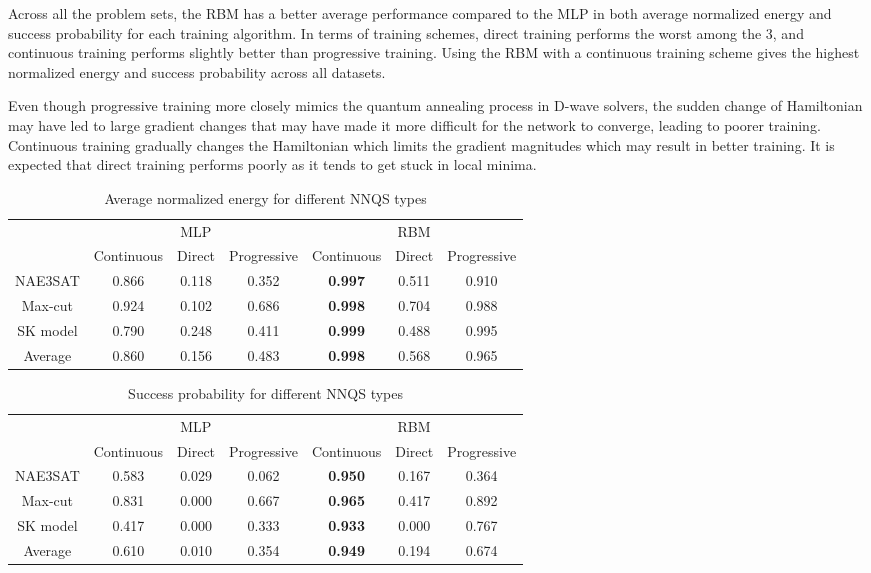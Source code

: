 Across all the problem sets, the RBM has a better average performance compared to the MLP in both average normalized energy and success probability for each training algorithm. In terms of training schemes, direct training performs the worst among the 3, and continuous training performs slightly better than progressive training. Using the RBM with a continuous training scheme gives the highest normalized energy and success probability across all datasets. 

Even though progressive training more closely mimics the quantum annealing process in D-wave solvers, the sudden change of Hamiltonian may have led to large gradient changes that may have made it more difficult for the network to converge, leading to poorer training. Continuous training gradually changes the Hamiltonian which limits the gradient magnitudes which may result in better training. It is expected that direct training performs poorly as it tends to get stuck in local minima.


\begin{table}[!ht]
    \centering
    \begin{tabular}{ccccccc} \toprule
        ~ & \multicolumn{3}{c}{MLP} & \multicolumn{3}{c}{RBM} \\
        \cmidrule{2-7} & Continuous & Direct & Progressive & Continuous & Direct & Progressive \\
        \midrule
        NAE3SAT & 0.866 & 0.118 & 0.352 & \textbf{0.997} & 0.511 & 0.910 \\
        Max-cut & 0.924 & 0.102 & 0.686 & \textbf{0.998} & 0.704 & 0.988 \\
        SK model & 0.790 & 0.248 & 0.411 & \textbf{0.999} & 0.488 & 0.995 \\ \midrule
        Average & 0.860 & 0.156 & 0.483 & \textbf{0.998} & 0.568 & 0.965 \\ \bottomrule
    \end{tabular}
    \caption{Average normalized energy for different NNQS types}
    \label{results:nnqsnormalizedenergy}
\end{table}

\begin{table}[!ht]
    \centering
    \begin{tabular}{ccccccc} \toprule
        ~ & \multicolumn{3}{c}{MLP} & \multicolumn{3}{c}{RBM} \\
        \cmidrule{2-7} & Continuous & Direct & Progressive & Continuous & Direct & Progressive \\
        \midrule
        NAE3SAT & 0.583 & 0.029 & 0.062 & \textbf{0.950} & 0.167 & 0.364 \\
        Max-cut & 0.831 & 0.000 & 0.667 & \textbf{0.965} & 0.417 & 0.892 \\
        SK model & 0.417 & 0.000 & 0.333 & \textbf{0.933} & 0.000 & 0.767 \\ \midrule
        Average & 0.610 & 0.010 & 0.354 & \textbf{0.949} & 0.194 & 0.674 \\ \bottomrule
    \end{tabular}
    \caption{Success probability for different NNQS types}
    \label{results:nnqssuccess}
\end{table}